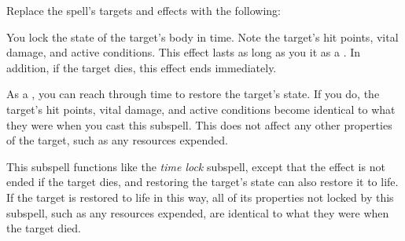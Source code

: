Replace the spell's targets and effects with the following:
\begin{spellcontent}

\begin{augmenttargetinginfo}



\end{augmenttargetinginfo}


\begin{augmenteffects}



\spelleffect
You lock the state of the target's body in time.
Note the target's hit points, vital damage, and active conditions.
This effect lasts as long as you  it as a .
In addition, if the target dies, this effect ends immediately.

As a , you can reach through time to restore the target's state.
If you do, the target's hit points, vital damage, and active conditions become identical to what they were when you cast this subspell.
This does not affect any other properties of the target, such as any resources expended.








\end{augmenteffects}

\end{spellcontent}






This subspell functions like the \textit{time lock} subspell, except that the effect is not ended if the target dies, and restoring the target's state can also restore it to life.
If the target is restored to life in this way, all of its properties not locked by this subspell, such as any resources expended, are identical to what they were when the target died.









